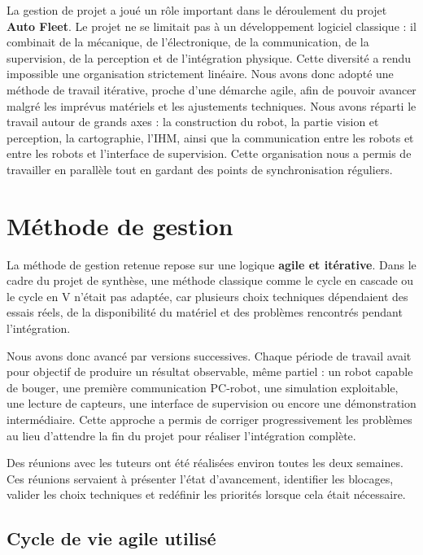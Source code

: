 \documentclass[11pt,a4paper]{report}
\begin{document}
La gestion de projet a joué un rôle important dans le déroulement du projet \textbf{Auto Fleet}. Le projet ne se limitait pas à un développement logiciel classique : il combinait de la mécanique, de l'électronique, de la communication, de la supervision, de la perception et de l'intégration physique. Cette diversité a rendu impossible une organisation strictement linéaire. Nous avons donc adopté une méthode de travail itérative, proche d'une démarche agile, afin de pouvoir avancer malgré les imprévus matériels et les ajustements techniques.
 Nous avons réparti le travail autour de grands axes : la construction du robot, la partie vision et perception, la cartographie, l'IHM, ainsi que la communication entre les robots et entre les robots et l'interface de supervision. Cette organisation nous a permis de travailler en parallèle tout en gardant des points de synchronisation réguliers.

\section{Méthode de gestion}

La méthode de gestion retenue repose sur une logique \textbf{agile et itérative}. Dans le cadre du projet de synthèse, une méthode classique comme le cycle en cascade ou le cycle en V n'était pas adaptée, car plusieurs choix techniques dépendaient des essais réels, de la disponibilité du matériel et des problèmes rencontrés pendant l'intégration.

Nous avons donc avancé par versions successives. Chaque période de travail avait pour objectif de produire un résultat observable, même partiel : un robot capable de bouger, une première communication PC-robot, une simulation exploitable, une lecture de capteurs, une interface de supervision ou encore une démonstration intermédiaire. Cette approche a permis de corriger progressivement les problèmes au lieu d'attendre la fin du projet pour réaliser l'intégration complète.

Des réunions avec les tuteurs ont été réalisées environ toutes les deux semaines. Ces réunions servaient à présenter l'état d'avancement, identifier les blocages, valider les choix techniques et redéfinir les priorités lorsque cela était nécessaire.

\subsection{Cycle de vie agile utilisé}
\end{document}
